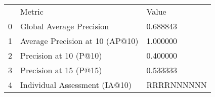 \begin{tabular}{lll}
 & Metric & Value \\
0 & Global Average Precision & 0.688843 \\
1 & Average Precision at 10 (AP@10) & 1.000000 \\
2 & Precision at 10 (P@10) & 0.400000 \\
3 & Precision at 15 (P@15) & 0.533333 \\
4 & Individual Assessment (IA@10) & RRRRNNNNNN \\
\end{tabular}
